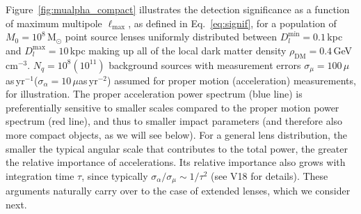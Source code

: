 \documentclass[prd,aps,twocolumn,nofootinbib,superscriptaddress,preprintnumbers,balancelastpage,longbibliography,floatfix]{revtex4-1}
\begin{document}
Figure~\ref{fig:mualpha_compact} illustrates the detection significance as a function of maximum multipole $\ell_\mathrm{max}$, as defined in Eq.~\eqref{eq:signif}, for a population of $M_0=10^8$\,M$_\odot$ point source lenses uniformly distributed between $D_l^{\mathrm{min}}=0.1$\,kpc and $D_l^{\mathrm{max}}=10$\,kpc making up all of the local dark matter density $\rho_\mathrm{DM}=0.4$\,GeV\,cm$^{-3}$. $N_q=10^8 (10^{11})$ background sources with measurement errors $\sigma_\mu=100\,\mu$as\,yr$^{-1}$($\sigma_\alpha=10\,\mu$as\,yr$^{-2}$) assumed for proper motion (acceleration) measurements, for illustration. The proper acceleration power spectrum (blue line) is preferentially sensitive to smaller scales compared to the proper motion power spectrum (red line), and thus to smaller impact parameters (and therefore also more compact objects, as we will see below). 
For a general lens distribution, the smaller the typical angular scale that contributes to the total power, the greater the relative importance of accelerations. Its relative importance also grows with integration time $\tau$, since typically $\sigma_\alpha/\sigma_\mu\sim1/\tau^2$ (see V18 for details). These arguments naturally carry over to the case of extended lenses, which we consider next.
\end{document}
